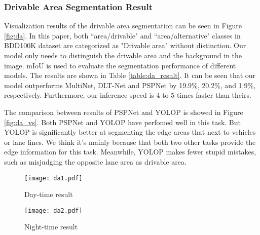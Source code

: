 \documentclass[10pt,twocolumn,letterpaper]{article}
\begin{document}
\subsubsection{Drivable Area Segmentation Result}
Visualization results of the drivable area segmentation can be seen in Figure \ref{fig:da}. In this paper, both ``area/drivable" and ``area/alternative" classes in BDD100K dataset are categorized as "Drivable area" without distinction. Our model only needs to distinguish the drivable area and the background in the image. mIoU is used to evaluate the segmentation performance of different models. The results are shown in Table \ref{table:da_result}. It can be seen that our model outperforms MultiNet, DLT-Net and PSPNet by 19.9\%, 20.2\%, and 1.9\%, respectively. Furthermore, our inference speed is 4 to 5 times faster than theirs.

The comparison between results of PSPNet and YOLOP is showed in Figure \ref{fig:da_vs}. Both PSPNet and YOLOP have perfomed well in this task. But YOLOP is significantly better at segmenting the edge areas that next to vehicles or lane lines. We think it's mainly because that both two other tasks provide the edge information for this task. Meanwhile, YOLOP makes fewer stupid mistakes, such as misjudging the opposite lane area as drivable area.

\begin{table}
\begin{center}
\end{center}
\caption{Drivable Area Segmentation Results: Comparing the proposed YOLOP with state-of-the-art drivable area segmentation or semantic segmentation methods.}
\label{table:da_result}
\end{table}

\begin{figure*}
\centering
\begin{subfigure}{\linewidth}
  \texttt{[image: da1.pdf]}
  \caption{Day-time result}
\end{subfigure}

\begin{subfigure}{\linewidth}
  \texttt{[image: da2.pdf]}
  \caption{Night-time result}
\end{subfigure}
   \caption{Visualization of the drivable area segmentation results of YOLOP. Top Row: Drivable area segmentation results in day-time scenes. Bottom row: Drivable area segmentation results in night scenes.}
\label{fig:da}
\end{figure*}
\end{document}
